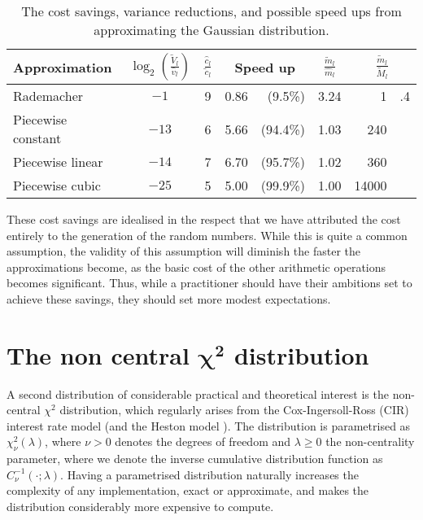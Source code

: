 \documentclass[9pt,a4paper,english]{extarticle}
\begin{document}
\begin{table}[htb]
\centering
\caption{The cost savings, variance reductions, and possible speed ups from approximating the Gaussian distribution.}
\label{tab:savings}
\begin{tabular}{lcclrcr@{}l}
Approximation  & $ {\log}_2 \left(\tfrac{\widetilde{V}_l}{\hat{v}_l}\right) $ & $ \tfrac{\hat{c}_l}{\tilde{c}_l} $ & \multicolumn{2}{c}{Speed up} & $ \tfrac{\widetilde{m}_l}{\widehat{m}_l} $ & \multicolumn{2}{c}{$ \tfrac{\widetilde{m}_l}{\widetilde{M}_l} $} \\[0.5em]
\hline
Rademacher & $ -1 $ & 9 & 0.86 & (9.5\%) & 3.24 & 1&.4 \\
Piecewise constant & $ -13 $ & 6 & 5.66 & (94.4\%) & 1.03 & 240& \\
Piecewise linear  & $ -14 $ & 7& 6.70 & (95.7\%) & 1.02 & 360 &\\
Piecewise cubic  & $ -25 $ & 5 & 5.00 & (99.9\%)& 1.00 & 14000 & 
\end{tabular}
\end{table}

These cost savings are idealised in the respect that we have attributed the cost entirely to the generation of the random numbers. While this is quite a common assumption, the validity of this assumption will diminish the faster the approximations become, as the basic cost of the other arithmetic operations becomes significant. Thus, while a practitioner should have their ambitions set to achieve these savings, they should set more modest expectations.

\section{The non central \texorpdfstring{$ \bm{\chi^2} $}{chi-squared} distribution}
\label{sec:the_non_central_chi_squared_distribution}

A second distribution of considerable practical and theoretical interest is the non-central $ \chi^2 $ distribution, which regularly arises from the Cox-Ingersoll-Ross (CIR) interest rate model \citep{cox1985theory} (and the Heston model \citep{heston1993closed}). The distribution is parametrised as $ \chi^2_\nu(\lambda) $, where $ \nu > 0 $ denotes the degrees of freedom and $ \lambda \geq 0 $ the non-centrality parameter, where we denote the inverse cumulative distribution function as $ C^{-1}_\nu(\cdot; \lambda) $. Having a parametrised distribution naturally increases the complexity of any implementation, exact or approximate, and makes the distribution considerably more expensive to compute. 
\end{document}
